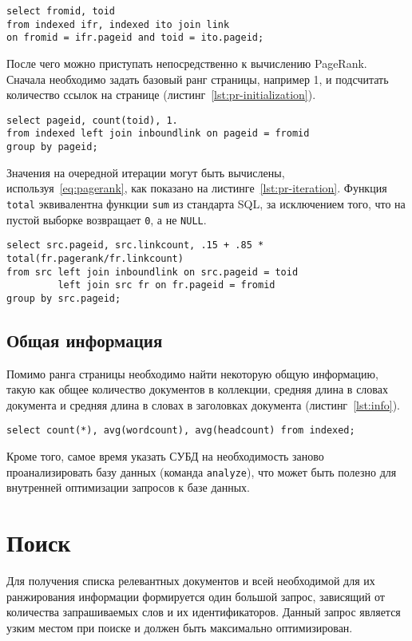 \begin{lstlisting}[language=sqlite, caption=Выборка внутренних для коллекции ссылок., label=lst:inboundlink]
select fromid, toid
from indexed ifr, indexed ito join link
on fromid = ifr.pageid and toid = ito.pageid;
\end{lstlisting}

После чего можно приступать непосредственно к вычислению PageRank. Сначала необходимо задать базовый ранг страницы, например 1, и подсчитать количество ссылок на странице (листинг~\ref{lst:pr-initialization}).
\begin{lstlisting}[language=sqlite, caption=Инициализация процесса вычисления PageRank., label=lst:pr-initialization]
select pageid, count(toid), 1.
from indexed left join inboundlink on pageid = fromid
group by pageid;
\end{lstlisting}

Значения на очередной итерации могут быть вычислены, используя~\ref{eq:pagerank}, как показано на листинге~\ref{lst:pr-iteration}. Функция \verb|total| эквивалентна функции \verb|sum| из стандарта SQL, за исключением того, что на пустой выборке возвращает \verb|0|, а не \verb|NULL|.
\begin{lstlisting}[language=sqlite, caption=Итерация процесса вычисления PageRank., label=lst:pr-iteration]
select src.pageid, src.linkcount, .15 + .85 * total(fr.pagerank/fr.linkcount)
from src left join inboundlink on src.pageid = toid
         left join src fr on fr.pageid = fromid
group by src.pageid;
\end{lstlisting}


\subsection{Общая информация}
Помимо ранга страницы необходимо найти некоторую общую информацию, такую как общее количество документов в коллекции, средняя длина в словах документа и средняя длина в словах в заголовках документа (листинг~\ref{lst:info}).
\begin{lstlisting}[language=sqlite, caption=Нахождение общей информации., label=lst:info]
select count(*), avg(wordcount), avg(headcount) from indexed;
\end{lstlisting}

Кроме того, самое время указать СУБД на необходимость заново проанализировать базу данных (команда \verb|analyze|), что может быть полезно для внутренней оптимизации запросов к базе данных.


\section{Поиск}
Для получения списка релевантных документов и всей необходимой для их ранжирования информации формируется один большой запрос, зависящий от количества запрашиваемых слов и их идентификаторов. Данный запрос является узким местом при поиске и должен быть максимально оптимизирован.

